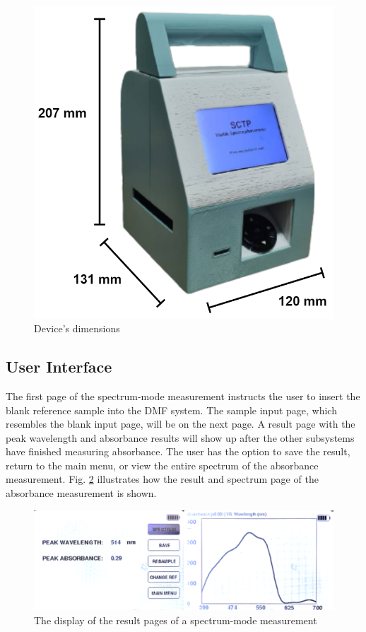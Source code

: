 \documentclass[conference]{IEEEtran}
\begin{document}
\begin{figure}[htbp]
    \centerline{\includegraphics[scale=0.25]{SCTP_size.png}}
    \caption{Device's dimensions}
    \label{device_dimensions}
    \end{figure}

\subsection{User Interface}
The first page of the spectrum-mode measurement instructs the user to insert the blank reference sample into the DMF system.
The sample input page, which resembles the blank input page, will be on the next page.
A result page with the peak wavelength and absorbance results will show up after the other subsystems have finished measuring absorbance.
The user has the option to save the result, return to the main menu, or view the entire spectrum of the absorbance measurement.
Fig. \ref{lcd-spec} illustrates how the result and spectrum page of the absorbance measurement is shown.

    \begin{figure}[htbp]
    \centerline{\includegraphics[scale=0.06]{lcd-spec.png}}
    \caption{The display of the result pages of a spectrum-mode measurement}
    \label{lcd-spec}
    \end{figure}
\end{document}
